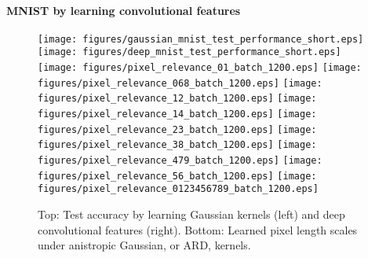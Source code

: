 \documentclass[twoside]{article}
\begin{document}
	\paragraph{MNIST by learning convolutional features}
	
		\begin{figure*}[t]
			\centering 
			\texttt{[image: figures/gaussian\_mnist\_test\_performance\_short.eps]}
			\texttt{[image: figures/deep\_mnist\_test\_performance\_short.eps]}
			\texttt{[image: figures/pixel\_relevance\_01\_batch\_1200.eps]}
			\texttt{[image: figures/pixel\_relevance\_068\_batch\_1200.eps]}
			\texttt{[image: figures/pixel\_relevance\_12\_batch\_1200.eps]}
			\texttt{[image: figures/pixel\_relevance\_14\_batch\_1200.eps]}
			\texttt{[image: figures/pixel\_relevance\_23\_batch\_1200.eps]}
			\texttt{[image: figures/pixel\_relevance\_38\_batch\_1200.eps]}
			\texttt{[image: figures/pixel\_relevance\_479\_batch\_1200.eps]}
			\texttt{[image: figures/pixel\_relevance\_56\_batch\_1200.eps]}
			\texttt{[image: figures/pixel\_relevance\_0123456789\_batch\_1200.eps]}
			\caption{Top: Test accuracy by learning Gaussian kernels (left) and deep convolutional features (right). Bottom: Learned pixel length scales under anistropic Gaussian, or \gls{ARD}, kernels.}
			\label{fig:mnist_experiments}
		\end{figure*}
		
\end{document}
